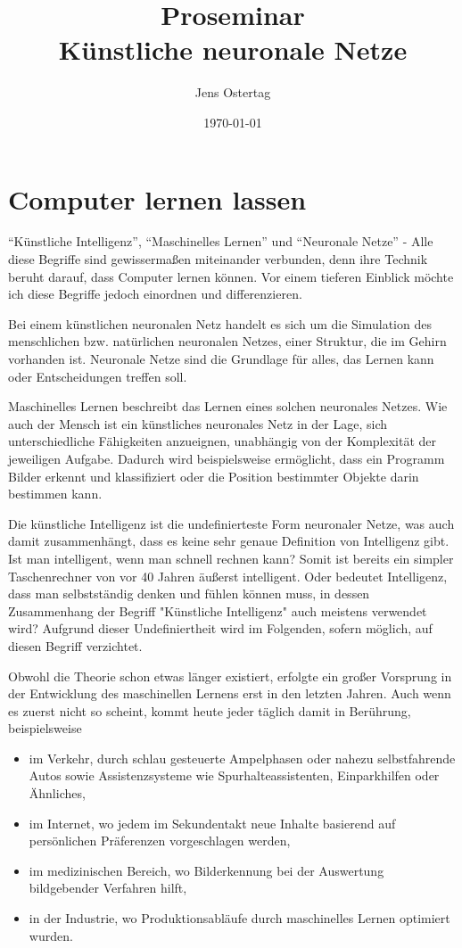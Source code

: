 \documentclass[12pt,a4]{article}
\title{\textbf{Proseminar\\Künstliche neuronale Netze}}
\author{Jens Ostertag}
\date{\today}
\begin{document}
\maketitle
\tableofcontents
\clearpage
\section{Computer lernen lassen}
\enquote{Künstliche Intelligenz}, \enquote{Maschinelles Lernen} und \enquote{Neuronale Netze} - Alle diese Begriffe sind gewissermaßen miteinander verbunden, denn ihre Technik beruht darauf, dass Computer lernen können. Vor einem tieferen Einblick möchte ich diese Begriffe jedoch einordnen und differenzieren.

Bei einem künstlichen neuronalen Netz handelt es sich um die Simulation des menschlichen bzw. natürlichen neuronalen Netzes, einer Struktur, die im Gehirn vorhanden ist. Neuronale Netze sind die Grundlage für alles, das Lernen kann oder Entscheidungen treffen soll.

Maschinelles Lernen beschreibt das Lernen eines solchen neuronales Netzes. Wie auch der Mensch ist ein künstliches neuronales Netz in der Lage, sich unterschiedliche Fähigkeiten anzueignen, unabhängig von der Komplexität der jeweiligen Aufgabe. Dadurch wird beispielsweise ermöglicht, dass ein Programm Bilder erkennt und klassifiziert oder die Position bestimmter Objekte darin bestimmen kann.

Die künstliche Intelligenz ist die undefinierteste Form neuronaler Netze, was auch damit zusammenhängt, dass es keine sehr genaue Definition von Intelligenz gibt. Ist man intelligent, wenn man schnell rechnen kann? Somit ist bereits ein simpler Taschenrechner von vor 40 Jahren äußerst intelligent. Oder bedeutet Intelligenz, dass man selbstständig denken und fühlen können muss, in dessen Zusammenhang der Begriff "Künstliche Intelligenz" auch meistens verwendet wird?
Aufgrund dieser Undefiniertheit wird im Folgenden, sofern möglich, auf diesen Begriff verzichtet.

Obwohl die Theorie schon etwas länger existiert, erfolgte ein großer Vorsprung in der Entwicklung des maschinellen Lernens erst in den letzten Jahren. Auch wenn es zuerst nicht so scheint, kommt heute jeder täglich damit in Berührung, beispielsweise
\begin{itemize}
\item im Verkehr, durch schlau gesteuerte Ampelphasen oder nahezu selbstfahrende Autos sowie Assistenzsysteme wie Spurhalteassistenten, Einparkhilfen oder Ähnliches,
\item im Internet, wo jedem im Sekundentakt neue Inhalte basierend auf persönlichen Präferenzen vorgeschlagen werden,
\item im medizinischen Bereich, wo Bilderkennung bei der Auswertung bildgebender Verfahren hilft,
\item in der Industrie, wo Produktionsabläufe durch maschinelles Lernen optimiert wurden.
\end{itemize}
\end{document}
